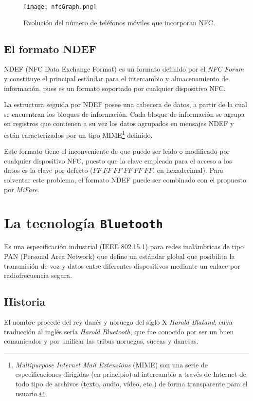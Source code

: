   \begin{figure}[!h]
    \begin{center}
      \texttt{[image: nfcGraph.png]}
      \caption{Evolución del número de teléfonos móviles que
      incorporan \acs{NFC}.}
      \label{fig:nfcGraph}
    \end{center}
  \end{figure}

  \subsection{El formato \acs{NDEF}}
\acs{NDEF} (\acs{NFC} Data Exchange Format) es un formato definido por el
\emph{NFC Forum} y constituye el principal estándar para el intercambio y
almacenamiento de información, pues es un formato soportado por cualquier 
dispositivo \acs{NFC}.

La estructura seguida por \acs{NDEF} posee una cabecera de datos, a partir de
la cual se encuentran los bloques de información. Cada bloque de información
se agrupa en registros que contienen a su vez los datos agrupados en mensajes
\acs{NDEF} y están caracterizados por un tipo \acs{MIME}\footnote{
\emph{Multipurpose Internet Mail Extensions} (\acs{MIME}) son una serie
de especificaciones dirigidas (en principio) al intercambio a través de
Internet de todo tipo de archivos (texto, audio, vídeo, etc.) de forma
transparente para el usuario.} definido.

Este formato tiene el inconveniente de que puede ser leido o modificado por
cualquier dispositivo \acs{NFC}, puesto que la clave empleada para el acceso
a los datos es la clave por defecto ($FF\ FF\ FF\ FF\ FF\ FF$, en hexadecimal).
Para solventar este problema, el formato \acs{NDEF} puede ser combinado con
el propuesto por \emph{MiFare}.

  \section{La tecnología \texttt{Bluetooth}}
  \label{subsec:bluetooth}
Es una especificación industrial (\acs{IEEE} 802.15.1) para redes inalámbricas
de tipo \acs{PAN} (Personal Area Network) que define un estándar global que
posibilita la transmisión de voz y datos entre diferentes dispositivos mediante
un enlace por radiofrecuencia segura.

  \subsection{Historia}
El nombre procede del rey danés y noruego del siglo X \emph{Harald Blatand},
cuya traducción al inglés sería \emph{Harold Bluetooth}, que fue conocido
por ser un buen comunicador y por unificar las tribus noruegas, suecas y
danesas.

